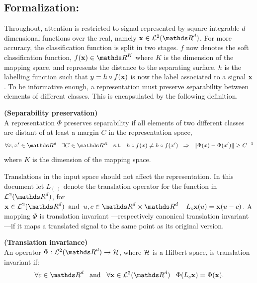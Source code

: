 \documentclass[a4paper,11pt]{report}
\begin{document}
      
		\subsection{Formalization:}
      \label{sec:Intro/Signal rep/Formalization}
      
			Throughout, attention is restricted to signal represented by square-integrable $d$-dimensional functions over the real, namely $\bfx \in \mcalL^{2}(\dsR^{d})$. For more accuracy, the classification function is split in two stages. $f$ now denotes the soft classification function, \ie $f(\bfx) \in \dsR^{K}$ where $K$ is the dimension of the mapping space, and represents the distance to the separating surface. $h$ is the labelling function such that $y=h \circ f({\bf x})$ is now the label associated to a signal ${\bf x}$. To be informative enough, a representation must preserve separability between elements of different classes. This is encapsulated by the following definition.
      
			\begin{defn} \textbf{(Separability preservation)}\\
				A representation $\Phi$ preserves separability if all elements of two different classes are distant of at least a margin $C$ in the representation space,
				\begin{equation*}
					\forall x,x' \in \dsR^{d} \;\;\; \exists C \in \dsR^{K} \;\;\; \st \;\;\; h \circ f(x) \neq h \circ f(x') \;\; \Rightarrow \;\; \norm{\Phi(x)-\Phi(x')} \geq C^{-1}
				\end{equation*}
				where $K$  is the dimension of the mapping space.
				\label{def:Separability}
			\end{defn}
			
      Translations in the input space should not affect the representation. In this document let $L_{(.)}$ denote the translation operator for the function in $\mcalL^{2}(\dsR^{d})$, \ie for $\bfx \in \mcalL^{2}(\dsR^{d}) \;\; \text{and} \;\; u,c \in \dsR^{d} \times \dsR^{d} \;\;\;\; L_{c}\bfx(u) = \bfx(u-c)$. A mapping $\Phi$ is translation invariant ---respectively canonical translation invariant ---if it maps a translated signal to the same point as its original version.

      \begin{defn} \textbf{(Translation invariance)}\\ 
				An operator $\Phi: \mcalL^{2}(\dsR^{d}) \rightarrow \mcalH$, where $\mathcal{H}$ is a Hilbert space, is translation invariant if:
	      	\begin{equation*}
			  		\forall c \in \dsR^{d} 
			  		\;\;\; \text{and}  \;\;\;
			  		\forall \bfx \in \mcalL^{2}(\dsR^{d}) \;\;\;
			  		\Phi(L_{c}\bfx) = \Phi(\bfx).
				\end{equation*}
				\label{def:Translation invariance - intuition}
      \end{defn}
      \vspace{-30pt}
\end{document}
